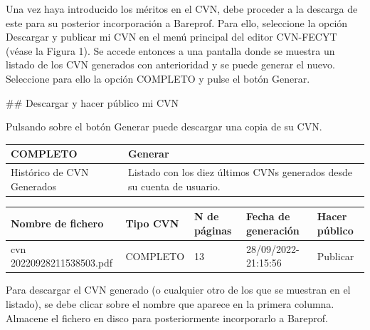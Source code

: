 \documentclass{article}
\begin{document}
\begin{itemize}
\begin{itemize}
\begin{scriptsize}
                  Una vez haya introducido los méritos en el CVN, debe proceder a la descarga de este para su posterior incorporación a Bareprof. Para ello, seleccione la opción Descargar y publicar mi CVN en el menú principal del editor CVN-FECYT (véase la Figura 1). Se accede entonces a una pantalla donde se muestra un listado de los CVN generados con anterioridad y se puede generar el nuevo. Seleccione para ello la opción COMPLETO y pulse el botón Generar.

                  \#\# Descargar y hacer público mi CVN

                  Pulsando sobre el botón Generar puede descargar una copia de su CVN.

                  \vspace{0.4cm}
                  \begin{table}[h!]\centering\renewcommand{\arraystretch}{1.3}
                    \begin{tabular}{|p{}|p{}|}\hline
                      COMPLETO                   & Generar                                                                 \\\hline
                      Histórico de CVN Generados & Listado con los diez últimos CVNs generados desde su cuenta de usuario. \\\hline
                    \end{tabular}\end{table}
                  \vspace{0.4cm}

                  \vspace{0.4cm}
                  \begin{table}[h!]\centering\renewcommand{\arraystretch}{1.3}
                    \begin{tabular}{|p{}|p{}|p{}|p{}|p{}|}\hline
                      Nombre de fichero         & Tipo CVN & N de páginas & Fecha de generación & Hacer público \\\hline
                      cvn 20220928211538503.pdf & COMPLETO & 13           & 28/09/2022-21:15:56 & Publicar      \\\hline
                    \end{tabular}\end{table}
                  \vspace{0.4cm}

                  Para descargar el CVN generado (o cualquier otro de los que se muestran en el listado), se debe clicar sobre el nombre que aparece en la primera columna. Almacene el fichero en disco para posteriormente incorporarlo a Bareprof.


\end{scriptsize}
\end{itemize}
\end{itemize}
\end{document}
